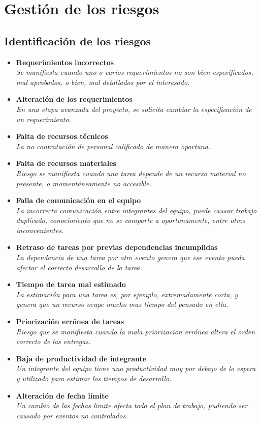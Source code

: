 \section{Gestión de los riesgos}

\subsection{Identificación de los riesgos}
\begin{itemize}
    \item \textbf{Requerimientos incorrectos} \\
    \textit{Se manifiesta cuando uno o varios requerimientos no son bien especificados, mal aprobados, o bien, mal detallados por el interesado.}
    \item \textbf{Alteración de los requerimientos} \\
    \textit{En una etapa avanzada del proyecto, se solicita cambiar la especificación de un requerimiento.}
    \item \textbf{Falta de recursos técnicos} \\
    \textit{La no contratación de personal calificado de manera oportuna.}
    \item  \textbf{Falta de recursos materiales} \\
    \textit{Riesgo se manifiesta cuando una tarea depende de un recurso material no presente, o momentáneamente no accesible.}
    \item \textbf{Falla de comunicación en el equipo} \\
    \textit{La incorrecta comunicación entre integrantes del equipo, puede causar trabajo duplicado, conocimiento que no se comparte a oportunamente, entre otros inconvenientes.}
    \item \textbf{Retraso de tareas por previas dependencias incumplidas} \\
    \textit{La dependencia de una tarea por otro evento genera que ese evento pueda afectar el correcto desarrollo de la tarea.}
    \item \textbf{Tiempo de tarea mal estimado} \\
    \textit{La estimación para una tarea es, por ejemplo, extremadamente corta, y genera que un recurso ocupe mucho mas tiempo del pensado en ella.}
    \item \textbf{Priorización errónea de tareas} \\
    \textit{Riesgo que se manifiesta cuando la mala priorizacion errónea altera el orden correcto de las entregas.}
    \item \textbf{Baja de productividad de integrante} \\
    \textit{Un integrante del equipo tiene una productividad muy por debajo de lo espera y utilizado para estimar los tiempos de desarrollo.}
    \item \textbf{Alteración de fecha límite} \\
    \textit{Un cambio de las fechas limite afecta todo el plan de trabajo, pudiendo ser causado por eventos no controlados.}
\end{itemize}
\newpage
